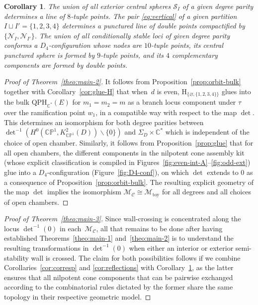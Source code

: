 \documentclass[pdftex]{sigma}
\newcommand{\field}[1]{\ensuremath{\mathbb{#1}}}
\newcommand{\CC}{\field{C}}
\newcommand{\PP}{\field{P}}
\newcommand{\curly}[1]{\mathscr{#1}}
\newcommand{\cM}{\curly{M}}
\newcommand{\cN}{\curly{N}}
\newcommand{\cS}{\curly{S}}
\newcommand{\qC}{\mathcal{C}}
\numberwithin{equation}{section}
\newtheorem{Corollary}[Theorem]{Corollary}
\begin{document}
\begin{Corollary}\label{cor:n-H-blocks}
The union of all exterior central spheres $\cS_{I}$ of a given degree parity
determines a line of $8$-tuple points. The pair \eqref{eq:vertical} of a given partition $I\sqcup I' =\{1,2,3,4\}$ determines a punctured line of double points compactified by $\{\cN_{I},\cN_{I'}\}$. The union of all conditionally stable loci of given degree parity conforms a $D_{4}$-configuration whose nodes are $10$-tuple points, its central punctured sphere is formed by $9$-tuple points, and its $4$ complementary components are formed by double points.
\end{Corollary}


{\sloppy\begin{proof}[Proof of Theorem~\ref{theo:main-2}]
It follows from Proposition~\ref{prop:orbit-bulk} together with Corollary~\ref{cor:glue-H} that when~$d$ is even, $\mathrm{H}_{\{\varnothing ,\{1,2,3,4\}\}}$ glues into the bulk $\mathrm{QPH}_{\CC^{*}}(E)$ for $m_{1}=m_{2}=m$ as a branch locus component under $\tau$ over the ramification point $w_{1}$, in a compatible way with respect to the map $\det$. This determines an isomorphism for both degree parities between $\det^{-1}(H^{0}(\CC\PP^{1},K^{2}_{\CC\PP^{1}}(D))\allowbreak\backslash\{0\})$ and $\Sigma_{D}\times\CC^{*}$ which is independent of the choice of open chamber. Similarly, it follows from Proposition~\ref{prop:glue} that for all open chambers, the different components in the nilpotent cone assembly kit (whose explicit classification is compiled in Figures~\ref{fig:even-int-A}--\ref{fig:odd-ext}) glue into a $D_{4}$-configuration (Figure~\ref{fig:D4-conf}), on which $\det$ extends to 0 as a consequence of Proposition~\ref{prop:orbit-bulk}. The resulting explicit geometry of the map $\det$ implies the isomorphism $\cM_{\qC}\cong \cM_{\mathrm{toy}}$ for all degrees and all choices of open chambers.
\end{proof}}

{\sloppy\begin{proof}[Proof of Theorem~\ref{theo:main-3}]
Since wall-crossing is concentrated along the locus $\det^{-1}(0)$ in each~$\cM_{\qC}$, all that remains to be done after having established Theorems~\ref{theo:main-1} and~\ref{theo:main-2} is to understand the resulting transformations in $\det^{-1}(0)$ when either an interior or exterior semi-stability wall is crossed. The claim for both possibilities follows if we combine Corollaries~\ref{cor:corresp} and \ref{cor:reflections} with Corollary~\ref{cor:n-H-blocks}, as the latter ensures that all nilpotent cone components that can be pairwise exchanged according to the combinatorial rules dictated by the former share the same topology in their respective geometric model. %
\end{proof}}
\end{document}
